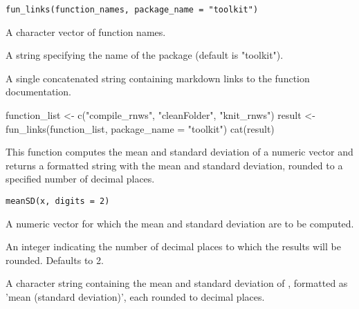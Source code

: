 \documentclass[a4paper]{book}
\begin{document}
%
\begin{Usage}
\begin{verbatim}
fun_links(function_names, package_name = "toolkit")
\end{verbatim}
\end{Usage}
%
\begin{Arguments}
\begin{ldescription}
\item[\code{function\_names}] A character vector of function names.

\item[\code{package\_name}] A string specifying the name of the package (default is "toolkit").
\end{ldescription}
\end{Arguments}
%
\begin{Value}
A single concatenated string containing markdown links to the function documentation.
\end{Value}
%
\begin{Examples}
\begin{ExampleCode}
function_list <- c("compile_rnws", "cleanFolder", "knit_rnws")
result <- fun_links(function_list, package_name = "toolkit")
cat(result)
\end{ExampleCode}
\end{Examples}
%
\begin{Description}
This function computes the mean and standard deviation of a numeric vector
and returns a formatted string with the mean and standard deviation, rounded to
a specified number of decimal places.
\end{Description}
%
\begin{Usage}
\begin{verbatim}
meanSD(x, digits = 2)
\end{verbatim}
\end{Usage}
%
\begin{Arguments}
\begin{ldescription}
\item[\code{x}] A numeric vector for which the mean and standard deviation are to be computed.

\item[\code{digits}] An integer indicating the number of decimal places to which the
results will be rounded. Defaults to 2.
\end{ldescription}
\end{Arguments}
%
\begin{Value}
A character string containing the mean and standard deviation of ,
formatted as 'mean (standard deviation)', each rounded to  decimal places.
\end{Value}
\end{document}
